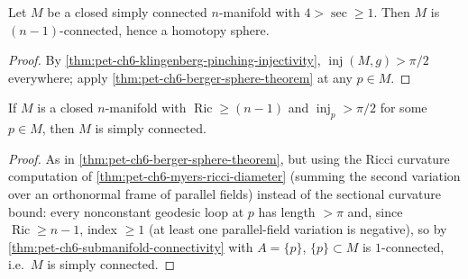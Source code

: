 \begin{corollary}
  \label{cor:pet-ch6-rauch-berger-klingenberg-sphere}
  Let $M$ be a closed simply connected $n$-manifold with $4>\sec\ge1$. Then
  $M$ is $(n-1)$-connected, hence a homotopy sphere.
\end{corollary}
\begin{proof}
  By \cref{thm:pet-ch6-klingenberg-pinching-injectivity}, $\operatorname{inj}(M,g)>\pi/2$
  everywhere; apply \cref{thm:pet-ch6-berger-sphere-theorem} at any $p\in M$.
\end{proof}

\begin{corollary}[Corollary 6.5.7]
  \label{cor:pet-ch6-ricci-simply-connected}
  If $M$ is a closed $n$-manifold with $\operatorname{Ric}\ge(n-1)$ and $\operatorname{inj}_p>\pi/2$
  for some $p\in M$, then $M$ is simply connected.
\end{corollary}
\begin{proof}
  As in \cref{thm:pet-ch6-berger-sphere-theorem}, but using the Ricci
  curvature computation of \cref{thm:pet-ch6-myers-ricci-diameter} (summing
  the second variation over an orthonormal frame of parallel fields) instead
  of the sectional curvature bound: every nonconstant geodesic loop at $p$
  has length $>\pi$ and, since $\operatorname{Ric}\ge n-1$, index $\ge1$ (at least one
  parallel-field variation is negative), so by
  \cref{thm:pet-ch6-submanifold-connectivity} with $A=\{p\}$, $\{p\}\subset M$
  is $1$-connected, i.e.\ $M$ is simply connected.
\end{proof}


